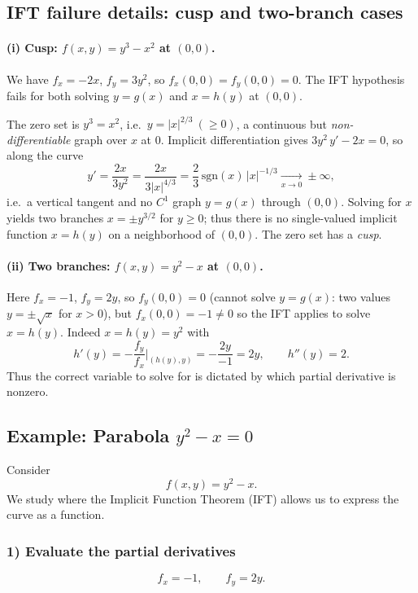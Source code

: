 \documentclass[12pt,a4paper]{article}
\theoremstyle{plain}
\theoremstyle{definition}
\theoremstyle{remark}
\theoremstyle{remark}
\begin{document}
	\subsection*{IFT failure details: cusp and two-branch cases}
	
	\paragraph{(i) Cusp: $f(x,y)=y^3-x^2$ at $(0,0)$.}
	We have $f_x=-2x$, $f_y=3y^2$, so $f_x(0,0)=f_y(0,0)=0$. The IFT hypothesis fails for both
	solving $y=g(x)$ and $x=h(y)$ at $(0,0)$.
	
	The zero set is $y^3=x^2$, i.e.\ $y=|x|^{2/3}\ (\ge0)$, a continuous but \emph{non-differentiable}
	graph over $x$ at $0$.
	Implicit differentiation gives $3y^2\,y'-2x=0$, so along the curve
	\[
	y'=\frac{2x}{3y^2}=\frac{2x}{3|x|^{4/3}}=\frac{2}{3}\,\mathrm{sgn}(x)\,|x|^{-1/3}\xrightarrow[x\to 0]{}\pm\infty,
	\]
	i.e.\ a vertical tangent and no $C^1$ graph $y=g(x)$ through $(0,0)$.
	Solving for $x$ yields two branches $x=\pm y^{3/2}$ for $y\ge0$; thus there is no single-valued
	implicit function $x=h(y)$ on a neighborhood of $(0,0)$. The zero set has a \emph{cusp}.
	
	\paragraph{(ii) Two branches: $f(x,y)=y^2-x$ at $(0,0)$.}
	Here $f_x=-1$, $f_y=2y$, so $f_y(0,0)=0$ (cannot solve $y=g(x)$: two values $y=\pm\sqrt{x}$ for $x>0$),
	but $f_x(0,0)=-1\neq0$ so the IFT applies to solve $x=h(y)$.
	Indeed $x=h(y)=y^2$ with
	\[
	h'(y)=-\frac{f_y}{f_x}\Big|_{(h(y),y)}=-\frac{2y}{-1}=2y,\qquad h''(y)=2.
	\]
	Thus the correct variable to solve for is dictated by which partial derivative is nonzero.
	
	\subsection*{Example: Parabola $y^2 - x = 0$}
	
	Consider 
	\[
	f(x,y) = y^2 - x.
	\]
	We study where the Implicit Function Theorem (IFT) allows us to express the curve as a function.
	
	\subsubsection*{1) Evaluate the partial derivatives}
	\[
	f_x = -1, 
	\qquad 
	f_y = 2y.
	\]
	
\end{document}
